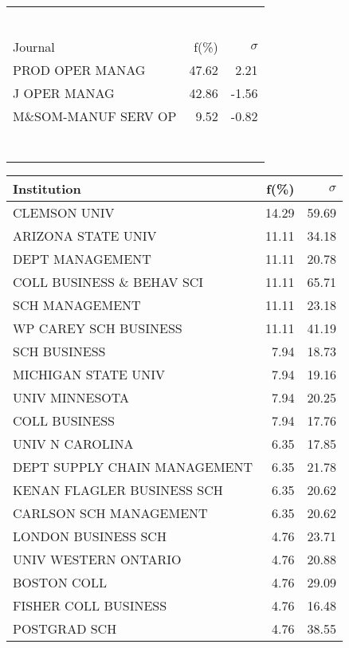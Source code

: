 \documentclass[a4paper,11pt]{report}
\begin{document}
\begin{landscape}
\begin{table}[!ht]
{\begin{tabular}{|l r r|}
 &  & \\
 &  & \\
 &  & \\
 &  & \\
 &  & \\
 &  & \\
\hline
\hline
Journal & f(\%) & $\sigma$\\
\hline
PROD OPER MANAG & 47.62 & 2.21\\
J OPER MANAG & 42.86 & -1.56\\
M\&SOM-MANUF SERV OP & 9.52 & -0.82\\
 &  & \\
 &  & \\
 &  & \\
 &  & \\
 &  & \\
 &  & \\
 &  & \\
\hline
\end{tabular}
}
{\scriptsize\begin{tabular}{|l r r|}
\hline
Institution & f(\%) & $\sigma$\\
\hline
CLEMSON UNIV & 14.29 & 59.69\\
ARIZONA STATE UNIV & 11.11 & 34.18\\
DEPT MANAGEMENT & 11.11 & 20.78\\
COLL BUSINESS \& BEHAV SCI & 11.11 & 65.71\\
SCH MANAGEMENT & 11.11 & 23.18\\
WP CAREY SCH BUSINESS & 11.11 & 41.19\\
SCH BUSINESS & 7.94 & 18.73\\
MICHIGAN STATE UNIV & 7.94 & 19.16\\
UNIV MINNESOTA & 7.94 & 20.25\\
COLL BUSINESS & 7.94 & 17.76\\
UNIV N CAROLINA & 6.35 & 17.85\\
DEPT SUPPLY CHAIN MANAGEMENT & 6.35 & 21.78\\
KENAN FLAGLER BUSINESS SCH & 6.35 & 20.62\\
CARLSON SCH MANAGEMENT & 6.35 & 20.62\\
LONDON BUSINESS SCH & 4.76 & 23.71\\
UNIV WESTERN ONTARIO & 4.76 & 20.88\\
BOSTON COLL & 4.76 & 29.09\\
FISHER COLL BUSINESS & 4.76 & 16.48\\
POSTGRAD SCH & 4.76 & 38.55\\

\end{tabular}}
\end{table}
\end{landscape}
\end{document}

